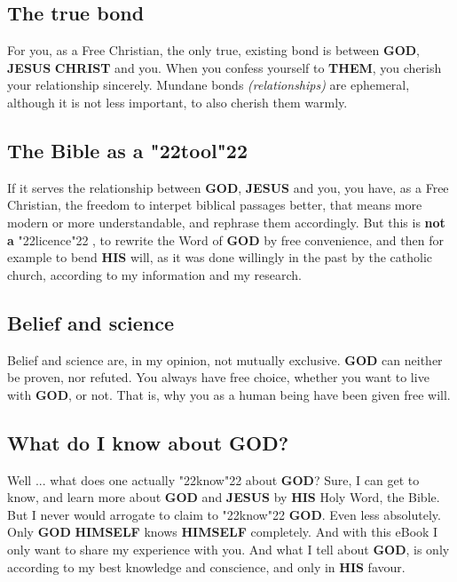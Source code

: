 \documentclass[12pt,a4paper]{article}
\newcommand{\Christ}[0]{\textbf{CHRIST}}
\newcommand{\God}[0]{\textbf{GOD}}
\newcommand{\Himself}[0]{\textbf{HIMSELF}}
\newcommand{\His}[0]{\textbf{HIS}}
\newcommand{\Jesus}[0]{\textbf{JESUS}}
\newcommand{\Them}[0]{\textbf{THEM}}
\newcommand{\q}[1]{\char"22{#1}\char"22 }
\begin{document}
	\subsection{The true bond}
		For you,
		as a Free Christian,
		the only true,
		existing bond is between {\God},
		{\Jesus} {\Christ} and you.
		When you confess yourself to {\Them},
		you cherish your relationship sincerely.
		Mundane bonds \textit{(relationships)} are ephemeral,
		although it is not less important,
		to also cherish them warmly.
			
	\subsection{The Bible as a \q{tool}}
		If it serves the relationship between {\God},
		{\Jesus} and you,
		you have,
		as a Free Christian,
		the freedom to interpet biblical passages better,
		that means more modern or more understandable,
		and rephrase them accordingly.
		But this is \textbf{not a} \q{licence},
		to rewrite the Word of {\God} by free convenience,
		and then for example to bend {\His} will,
		as it was done willingly in the past by the catholic church,
		according to my information and my research.
		
	\subsection{Belief and science}
		Belief and science are,
		in my opinion,
		not mutually exclusive.
		{\God} can neither be proven,
		nor refuted.
		You always have free choice,
		whether you want to live with {\God},
		or not.
		That is,
		why you as a human being have been given free will.

	\subsection{What do I know about {\God}?}
		Well ... what does one actually \q{know} about {\God}?
		Sure,
		I can get to know,
		and learn more about {\God} and {\Jesus} by {\His} Holy Word,
		the Bible.
		But I never would arrogate to claim to \q{know} {\God}.
		Even less absolutely.
		Only {\God} {\Himself} knows {\Himself} completely.
		And with this eBook I only want to share my experience with you.
		And what I tell about {\God},
		is only according to my best knowledge and conscience,
		and only in {\His} favour.
		
\end{document}
